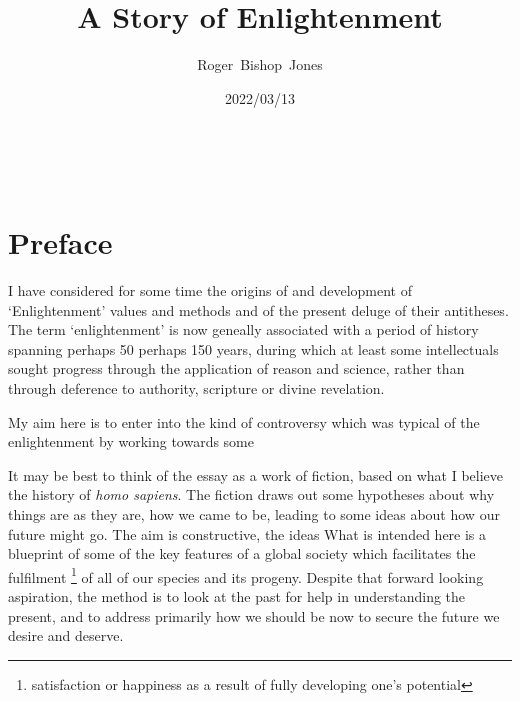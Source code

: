 \documentclass[10pt,titlepage]{article}
\title{\LARGE\bf A Story of Enlightenment}
\author{Roger~Bishop~Jones}
\date{\small 2022/03/13}
\newcommand{\ignore}[1]{}
\begin{document}
                               
\begin{titlepage}
\maketitle





\end{titlepage}

\ \

\ignore{
\begin{centering}
{}
\end{centering}
}%

\setcounter{tocdepth}{2}
{\parskip-0pt\tableofcontents}


\pagebreak

\section*{Preface}

I have considered for some time the origins of and development of `Enlightenment' values and methods and of the present deluge of their antitheses.
The term `enlightenment' is now geneally associated with a period of history spanning perhaps 50 perhaps 150 years, during which at least some intellectuals sought progress through the application of reason and science, rather than through deference to authority, scripture or divine revelation.

My aim here is to enter into the kind of controversy which was typical of the enlightenment by working towards some 

It may be best to think of the essay as a work of fiction, based on what I believe the history of \emph{homo sapiens}.
The fiction draws out some hypotheses about why things are as they are, how we came to be, leading to some ideas about how our future might go.
The aim is constructive, the ideas
What is intended here is a blueprint of some of the key features of a global society which facilitates the fulfilment%
\footnote{satisfaction or happiness as a result of fully developing one's potential}
of all of our species and its progeny.
Despite that forward looking aspiration, the method is to look at the past for help in understanding the present, and to address primarily how we should be now to secure the future we desire and deserve.
\end{document}
